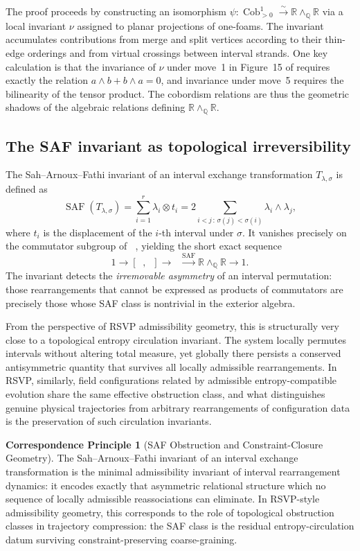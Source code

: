 \documentclass[12pt, a4paper]{article}
\theoremstyle{plain}
\theoremstyle{definition}
\theoremstyle{correspondence}
\newtheorem{corrprin}[theorem]{Correspondence Principle}
\DeclareMathOperator{\Cob}{Cob}
\DeclareMathOperator{\AutIET}{Aut_{IET}}
\DeclareMathOperator{\SAF}{SAF}
\newcommand{\RR}{\mathbb{R}}
\newcommand{\QQ}{\mathbb{Q}}
\newcommand{\wedgeQ}{\wedge_{\QQ}}
\begin{document}
The proof proceeds by constructing an isomorphism $\psi : \Cob^1_{>0} \xrightarrow{\sim} \RR \wedgeQ \RR$
via a local invariant $\nu$ assigned to planar projections of one-foams. The invariant
accumulates contributions from merge and split vertices according to their thin-edge
orderings and from virtual crossings between interval strands. One key calculation is
that the invariance of $\nu$ under move~1 in Figure~15 of \cite{IK24foam} requires
exactly the relation $a \wedge b + b \wedge a = 0$, and invariance under move~5 requires
the bilinearity of the tensor product. The cobordism relations are thus the geometric
shadows of the algebraic relations defining $\RR \wedgeQ \RR$.

\subsection{The SAF invariant as topological irreversibility}

The Sah--Arnoux--Fathi invariant of an interval exchange transformation
$T_{\lambda, \sigma}$ is defined as
\[
\SAF(T_{\lambda,\sigma}) = \sum_{i=1}^r \lambda_i \otimes t_i
= 2 \sum_{i < j \,:\, \sigma(j) < \sigma(i)} \lambda_i \wedge \lambda_j,
\]
where $t_i$ is the displacement of the $i$-th interval under $\sigma$. It vanishes
precisely on the commutator subgroup of $\AutIET$, yielding the short exact sequence
\[
1 \to [\AutIET, \AutIET] \to \AutIET \xrightarrow{\SAF} \RR \wedgeQ \RR \to 1.
\]
The invariant detects the \emph{irremovable asymmetry} of an interval permutation:
those rearrangements that cannot be expressed as products of commutators are precisely
those whose SAF class is nontrivial in the exterior algebra.

From the perspective of RSVP admissibility geometry, this is structurally very close to
a topological entropy circulation invariant. The system locally permutes intervals without
altering total measure, yet globally there persists a conserved antisymmetric quantity
that survives all locally admissible rearrangements. In RSVP, similarly, field
configurations related by admissible entropy-compatible evolution share the same
effective obstruction class, and what distinguishes genuine physical trajectories from
arbitrary rearrangements of configuration data is the preservation of such circulation
invariants.

\begin{corrprin}[SAF Obstruction and Constraint-Closure Geometry]
\label{cp:SAF}
The Sah--Arnoux--Fathi invariant of an interval exchange transformation is the minimal
admissibility invariant of interval rearrangement dynamics: it encodes exactly that
asymmetric relational structure which no sequence of locally admissible reassociations
can eliminate. In RSVP-style admissibility geometry, this corresponds to the role of
topological obstruction classes in trajectory compression: the SAF class is the
residual entropy-circulation datum surviving constraint-preserving coarse-graining.
\end{corrprin}
\end{document}
